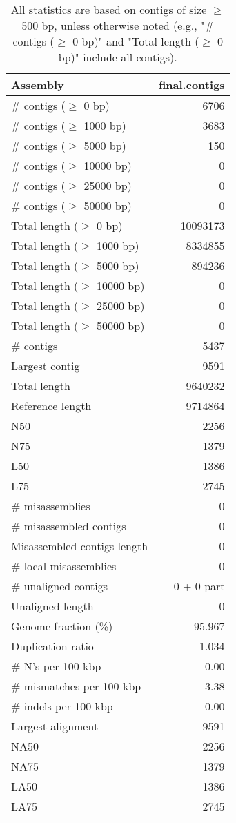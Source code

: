 \documentclass[12pt,a4paper]{article}
\begin{document}
\begin{table}[ht]
\begin{center}
\caption{All statistics are based on contigs of size $\geq$ 500 bp, unless otherwise noted (e.g., "\# contigs ($\geq$ 0 bp)" and "Total length ($\geq$ 0 bp)" include all contigs).}
\begin{tabular}{|l*{1}{|r}|}
\hline
Assembly & final.contigs \\ \hline
\# contigs ($\geq$ 0 bp) & 6706 \\ \hline
\# contigs ($\geq$ 1000 bp) & 3683 \\ \hline
\# contigs ($\geq$ 5000 bp) & 150 \\ \hline
\# contigs ($\geq$ 10000 bp) & 0 \\ \hline
\# contigs ($\geq$ 25000 bp) & 0 \\ \hline
\# contigs ($\geq$ 50000 bp) & 0 \\ \hline
Total length ($\geq$ 0 bp) & 10093173 \\ \hline
Total length ($\geq$ 1000 bp) & 8334855 \\ \hline
Total length ($\geq$ 5000 bp) & 894236 \\ \hline
Total length ($\geq$ 10000 bp) & 0 \\ \hline
Total length ($\geq$ 25000 bp) & 0 \\ \hline
Total length ($\geq$ 50000 bp) & 0 \\ \hline
\# contigs & 5437 \\ \hline
Largest contig & 9591 \\ \hline
Total length & 9640232 \\ \hline
Reference length & 9714864 \\ \hline
N50 & 2256 \\ \hline
N75 & 1379 \\ \hline
L50 & 1386 \\ \hline
L75 & 2745 \\ \hline
\# misassemblies & 0 \\ \hline
\# misassembled contigs & 0 \\ \hline
Misassembled contigs length & 0 \\ \hline
\# local misassemblies & 0 \\ \hline
\# unaligned contigs & 0 + 0 part \\ \hline
Unaligned length & 0 \\ \hline
Genome fraction (\%) & 95.967 \\ \hline
Duplication ratio & 1.034 \\ \hline
\# N's per 100 kbp & 0.00 \\ \hline
\# mismatches per 100 kbp & 3.38 \\ \hline
\# indels per 100 kbp & 0.00 \\ \hline
Largest alignment & 9591 \\ \hline
NA50 & 2256 \\ \hline
NA75 & 1379 \\ \hline
LA50 & 1386 \\ \hline
LA75 & 2745 \\ \hline
\end{tabular}
\end{center}
\end{table}
\end{document}
